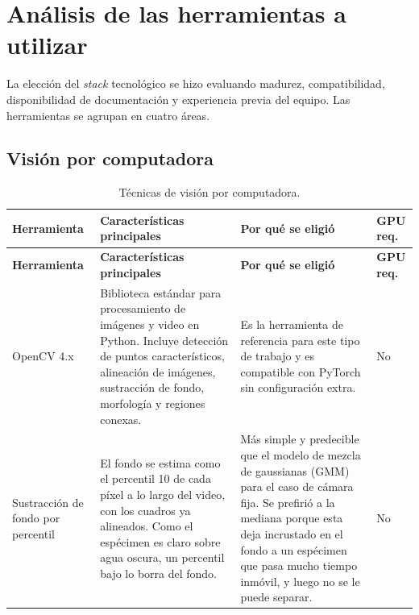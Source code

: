\begin{longtable}{|>{\bfseries}p{1.1cm}|>{\raggedright}p{8.1cm}|>{\raggedright\arraybackslash}p{3.9cm}|}
\end{longtable}

\section{Análisis de las herramientas a utilizar}

La elección del \textit{stack} tecnológico se hizo evaluando madurez, compatibilidad,
disponibilidad de documentación y experiencia previa del equipo. Las herramientas se
agrupan en cuatro áreas.

\subsection{Visión por computadora}

\begin{longtable}{|p{2.7cm}|p{4.4cm}|p{4.8cm}|p{1.3cm}|}
\caption{Técnicas de visión por computadora.
\label{tab:herr_cv}}\\
\hline
\textbf{Herramienta} & \textbf{Características principales} & \textbf{Por qué se eligió} & \textbf{GPU req.} \\
\hline
\endfirsthead
\hline
\textbf{Herramienta} & \textbf{Características principales} & \textbf{Por qué se eligió} & \textbf{GPU req.} \\
\hline
\endhead
\hline
\endfoot

OpenCV 4.x \cite{bradski2008}
    & Biblioteca estándar para procesamiento de imágenes y video en Python. Incluye
      detección de puntos característicos, alineación de imágenes, sustracción de
      fondo, morfología y regiones conexas.
    & Es la herramienta de referencia para este tipo de trabajo y es compatible con
      PyTorch sin configuración extra.
    & No \\
\hline
Sustracción de fondo por percentil \cite{piccardi2004}
    & El fondo se estima como el percentil 10 de cada píxel a lo largo del video,
      con los cuadros ya alineados. Como el espécimen es claro sobre agua oscura,
      un percentil bajo lo borra del fondo.
    & Más simple y predecible que el modelo de mezcla de gaussianas (GMM) \cite{zivkovic2004} para el caso de cámara
      fija. Se prefirió a la mediana porque esta deja incrustado en el fondo a un
      espécimen que pasa mucho tiempo inmóvil, y luego no se le puede separar.
    & No \\
\hline

\end{longtable}


